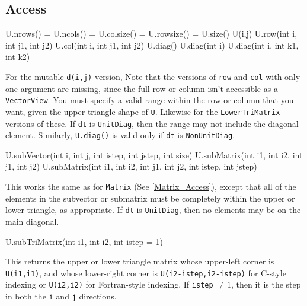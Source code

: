 \documentclass[twoside,letterpaper,11pt]{article}
\renewcommand{\tt}[1]{{\lstinline {#1}}}
\begin{document}
\begin{itemize}
\end{itemize}

\subsection{Access}
\label{TriMatrix_Access}

\begin{tmvcode}
U.nrows() = U.ncols() = U.colsize() = U.rowsize() = U.size()
U(i,j)
U.row(int i, int j1, int j2)
U.col(int i, int j1, int j2)
U.diag()
U.diag(int i)
U.diag(int i, int k1, int k2)
\end{tmvcode}
For the mutable \tt{d(i,j)} version, 
Note that the versions of \tt{row} and \tt{col} with only one argument are
missing, since the full row or column isn't accessible as a \tt{VectorView}.
You must specify a valid range within the row or column that you want, 
given the upper triangle shape of \tt{U}.  Likewise for the \tt{LowerTriMatrix}
versions of these.
If \tt{dt} is \tt{UnitDiag}, then the range may not include the diagonal element.
Similarly, \tt{U.diag()} is valid only if \tt{dt} is \tt{NonUnitDiag}.

\begin{tmvcode}
U.subVector(int i, int j, int istep, int jstep, int size)
U.subMatrix(int i1, int i2, int j1, int j2)
U.subMatrix(int i1, int i2, int j1, int j2, int istep, int jstep)
\end{tmvcode}
This works the same as for \tt{Matrix}
(See \ref{Matrix_Access}),
except that all of the elements in the 
subvector or submatrix must be completely within the upper or lower triangle, as
appropriate.  If \tt{dt} is \tt{UnitDiag}, then no elements may be on the 
main diagonal.

\begin{tmvcode}
U.subTriMatrix(int i1, int i2, int istep = 1)
\end{tmvcode}
This returns the upper or lower triangle matrix whose upper-left
corner is \tt{U(i1,i1)}, and whose lower-right corner is 
\tt{U(i2-istep,i2-istep)} for C-style indexing or \tt{U(i2,i2)} 
for Fortran-style indexing.  If \tt{istep} $\neq 1$, then it is the 
step in both the \tt{i} and \tt{j} directions.
\end{document}
